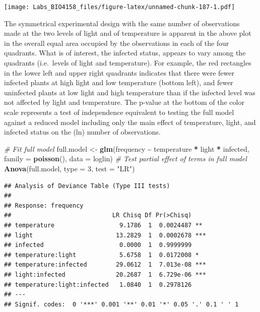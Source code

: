 \documentclass[
  12pt,
]{book}
\newenvironment{Shaded}{\begin{snugshade}}{\end{snugshade}}
\newcommand{\CommentTok}[1]{\textcolor[rgb]{0.56,0.35,0.01}{\textit{#1}}}
\newcommand{\DataTypeTok}[1]{\textcolor[rgb]{0.13,0.29,0.53}{#1}}
\newcommand{\DecValTok}[1]{\textcolor[rgb]{0.00,0.00,0.81}{#1}}
\newcommand{\KeywordTok}[1]{\textcolor[rgb]{0.13,0.29,0.53}{\textbf{#1}}}
\newcommand{\NormalTok}[1]{#1}
\newcommand{\OperatorTok}[1]{\textcolor[rgb]{0.81,0.36,0.00}{\textbf{#1}}}
\newcommand{\StringTok}[1]{\textcolor[rgb]{0.31,0.60,0.02}{#1}}
\begin{document}
\texttt{[image: Labs\_BIO4158\_files/figure-latex/unnamed-chunk-187-1.pdf]}

The symmetrical experimental design with the same number of observations made at the two levels of light and of temperature is apparent in the above plot in the overall equal area occupied by the observations in each of the four quadrants. What is of interest, the infected status, appears to vary among the quadrants (i.e.~levels of light and temperature). For example, the red rectangles in the lower left and upper right quadrants indicates that there were fewer infected plants at high light and low temperature (bottom left), and fewer uninfected plants at low light and high temperature than if the infected level was not affected by light and temperature. The p-value at the bottom of the color scale represents a test of independence equivalent to testing the full model against a reduced model including only the main effect of temperature, light, and infected status on the (ln) number of observations.

\begin{Shaded}
\begin{Highlighting}[]
\CommentTok{\# Fit full model}
\NormalTok{full.model \textless{}{-}}\StringTok{ }\KeywordTok{glm}\NormalTok{(frequency }\OperatorTok{\textasciitilde{}}\StringTok{ }\NormalTok{temperature }\OperatorTok{*}\StringTok{ }\NormalTok{light }\OperatorTok{*}\StringTok{ }\NormalTok{infected, }\DataTypeTok{family =} \KeywordTok{poisson}\NormalTok{(), }\DataTypeTok{data =}\NormalTok{ loglin)}
\CommentTok{\# Test partial effect of terms in full model}
\KeywordTok{Anova}\NormalTok{(full.model, }\DataTypeTok{type =} \DecValTok{3}\NormalTok{, }\DataTypeTok{test =} \StringTok{"LR"}\NormalTok{)}
\end{Highlighting}
\end{Shaded}

\begin{verbatim}
## Analysis of Deviance Table (Type III tests)
## 
## Response: frequency
##                            LR Chisq Df Pr(>Chisq)    
## temperature                  9.1786  1  0.0024487 ** 
## light                       13.2829  1  0.0002678 ***
## infected                     0.0000  1  0.9999999    
## temperature:light            5.6758  1  0.0172008 *  
## temperature:infected        29.0612  1  7.013e-08 ***
## light:infected              20.2687  1  6.729e-06 ***
## temperature:light:infected   1.0840  1  0.2978126    
## ---
## Signif. codes:  0 '***' 0.001 '**' 0.01 '*' 0.05 '.' 0.1 ' ' 1
\end{verbatim}
\end{document}
